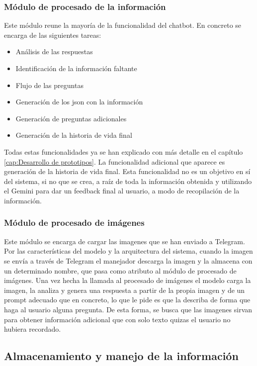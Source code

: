 \subsubsection{Módulo de procesado de la información}
Este módulo reune la mayoría de la funcionalidad del chatbot. En concreto se encarga de las siguientes tareas: 
\begin{itemize}
	\item Análisis de las respuestas 
	\item Identificación de la información faltante
	\item Flujo de las preguntas
	\item Generación de los json con la información
	\item Generación de preguntas adicionales 
	 \item Generación de la historia de vida final
\end{itemize}
Todas estas funcionalidades ya se han explicado con más detalle en el capítulo \ref{cap:Desarrollo de prototipos}. La funcionalidad adicional que aparece es generación de la historia de vida final. Esta funcionalidad no es un objetivo en sí del sistema, si no que se crea, a raíz de toda la información obtenida y utilizando el Gemini para dar un feedback final al usuario, a modo de recopilación de la información. %
\subsubsection{Módulo de procesado de imágenes}
Este módulo se encarga de cargar las imagenes que se han enviado a Telegram. Por las características del modelo y la arquitectura del sistema, cuando la imagen se envía a través de Telegram el manejador descarga la imagen y la almacena con un determinado nombre, que pasa como atributo al módulo de procesado de imágenes. Una vez hecha la llamada al procesado de imágenes el modelo carga la imagen, la analiza y genera una respuesta a partir de la propia imagen y de un prompt adecuado que en concreto, lo que le pide es que la describa de forma que haga al usuario alguna pregunta. De esta forma, se busca que las imagenes sirvan para obtener información adicional que con solo texto quizas el usuario no hubiera recordado. 

\subsection{Almacenamiento y manejo de la información}

